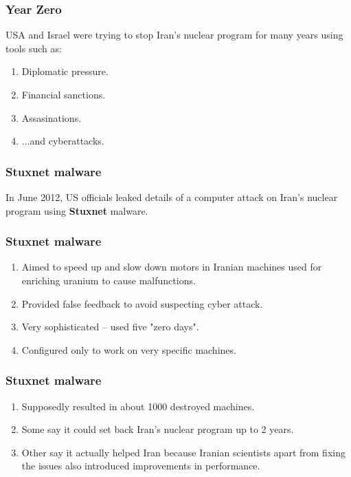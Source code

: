 \documentclass[xcolor=table]{beamer}
\begin{document}
\begin{frame}
\frametitle{Year Zero}
USA and Israel were trying to stop Iran's nuclear program for many years using tools such as:
\begin{enumerate}
\item \large{Diplomatic pressure.}
\item \large{Financial sanctions.}
\item \large{Assasinations.}
\pause
\item \large{...and cyberattacks.}
\end{enumerate}
\end{frame}

\begin{frame}
\frametitle{Stuxnet malware}
\Large{In June 2012, US officials leaked details of a computer attack on Iran’s nuclear program using \textbf{Stuxnet} malware.}
\end{frame}

\begin{frame}
\frametitle{Stuxnet malware}
\begin{enumerate}
\item \large{Aimed to speed up and slow down motors in Iranian machines used for enriching uranium to cause malfunctions.}
\item \large{Provided false feedback to avoid suspecting cyber attack.}
\item \large{Very sophisticated -- used five "zero days".}
\item \large{Configured only to work on very specific machines.}
\end{enumerate}
\end{frame}

\begin{frame}
\frametitle{Stuxnet malware}
\begin{enumerate}
\item \large{Supposedly resulted in about 1000 destroyed machines.}
\item \large{Some say it could set back Iran's nuclear program up to 2 years.}
\item \large{Other say it actually helped Iran because Iranian scientists apart from fixing the issues also introduced improvements in performance.}
\end{enumerate}
\end{frame}
\end{document}
